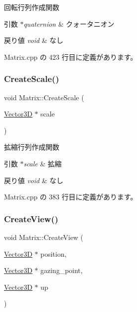 回転行列作成関数 


\begin{DoxyParams}{引数}
{\em $\ast$quaternion} & クォータニオン \\
\hline
\end{DoxyParams}

\begin{DoxyRetVals}{戻り値}
{\em void} & なし \\
\hline
\end{DoxyRetVals}


 Matrix.\+cpp の 423 行目に定義があります。

\mbox{\label{class_matrix_a334baeec0ce11d8766a3e5679aa0ebca}} 
\subsubsection{\texorpdfstring{Create\+Scale()}{CreateScale()}}
{\footnotesize\ttfamily void Matrix\+::\+Create\+Scale (\begin{DoxyParamCaption}\item[{\mbox{\hyperlink{class_vector3_d}{Vector3D}} $\ast$}]{scale }\end{DoxyParamCaption})}



拡縮行列作成関数 


\begin{DoxyParams}{引数}
{\em $\ast$scale} & 拡縮 \\
\hline
\end{DoxyParams}

\begin{DoxyRetVals}{戻り値}
{\em void} & なし \\
\hline
\end{DoxyRetVals}


 Matrix.\+cpp の 383 行目に定義があります。

\mbox{\label{class_matrix_ab0de7031b10ae5993e26627839daf93f}} 
\subsubsection{\texorpdfstring{Create\+View()}{CreateView()}}
{\footnotesize\ttfamily void Matrix\+::\+Create\+View (\begin{DoxyParamCaption}\item[{\mbox{\hyperlink{class_vector3_d}{Vector3D}} $\ast$}]{position,  }\item[{\mbox{\hyperlink{class_vector3_d}{Vector3D}} $\ast$}]{gazing\+\_\+point,  }\item[{\mbox{\hyperlink{class_vector3_d}{Vector3D}} $\ast$}]{up }\end{DoxyParamCaption})}



